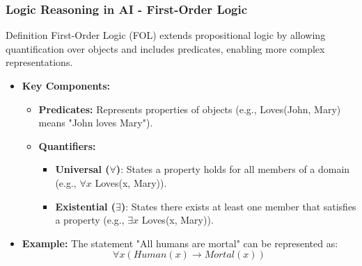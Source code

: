 \documentclass[aspectratio=169]{beamer}
\begin{document}
\begin{frame}[fragile]
  \frametitle{Logic Reasoning in AI - First-Order Logic}
  \begin{block}{Definition}
    First-Order Logic (FOL) extends propositional logic by allowing quantification over objects and includes predicates, enabling more complex representations.
  \end{block}
  
  \begin{itemize}
    \item \textbf{Key Components:}
      \begin{itemize}
        \item \textbf{Predicates:} Represents properties of objects (e.g., Loves(John, Mary) means "John loves Mary").
        \item \textbf{Quantifiers:} 
          \begin{itemize}
            \item \textbf{Universal ($\forall$)}: States a property holds for all members of a domain (e.g., $\forall x$ Loves(x, Mary)).
            \item \textbf{Existential ($\exists$)}: States there exists at least one member that satisfies a property (e.g., $\exists x$ Loves(x, Mary)).
          \end{itemize}
      \end{itemize}
    
    \item \textbf{Example:} The statement "All humans are mortal" can be represented as:
    \[
      \forall x (Human(x) \rightarrow Mortal(x))
    \]
  \end{itemize}
\end{frame}
\end{document}
